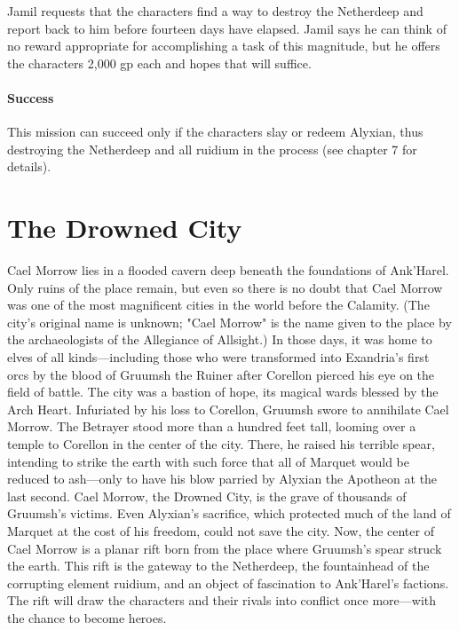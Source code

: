 \documentclass[letterpaper, 11pt, bg=full, twocolumn]{dndbook}
\begin{document}
Jamil requests that the characters find a way to destroy the Netherdeep and report back to him before fourteen days have elapsed. Jamil says he can think of no reward appropriate for accomplishing a task of this magnitude, but he offers the characters 2,000 gp each and hopes that will suffice.

\subsubsection{Success}

This mission can succeed only if the characters slay or redeem Alyxian, thus destroying the Netherdeep and all ruidium in the process (see chapter 7 for details).

\chapter{The Drowned City}\label{ch:the-drowned-city-6-6}

Cael Morrow lies in a flooded cavern deep beneath the foundations of Ank'Harel. Only ruins of the place remain, but even so there is no doubt that Cael Morrow was one of the most magnificent cities in the world before the Calamity. (The city's original name is unknown; "Cael Morrow" is the name given to the place by the archaeologists of the Allegiance of Allsight.) In those days, it was home to elves of all kinds---including those who were transformed into Exandria's first orcs by the blood of Gruumsh the Ruiner after Corellon pierced his eye on the field of battle. The city was a bastion of hope, its magical wards blessed by the Arch Heart.
Infuriated by his loss to Corellon, Gruumsh swore to annihilate Cael Morrow. The Betrayer stood more than a hundred feet tall, looming over a temple to Corellon in the center of the city. There, he raised his terrible spear, intending to strike the earth with such force that all of Marquet would be reduced to ash---only to have his blow parried by Alyxian the Apotheon at the last second.
Cael Morrow, the Drowned City, is the grave of thousands of Gruumsh's victims. Even Alyxian's sacrifice, which protected much of the land of Marquet at the cost of his freedom, could not save the city. Now, the center of Cael Morrow is a planar rift born from the place where Gruumsh's spear struck the earth. This rift is the gateway to the Netherdeep, the fountainhead of the corrupting element ruidium, and an object of fascination to Ank'Harel's factions. The rift will draw the characters and their rivals into conflict once more---with the chance to become heroes.
\end{document}
